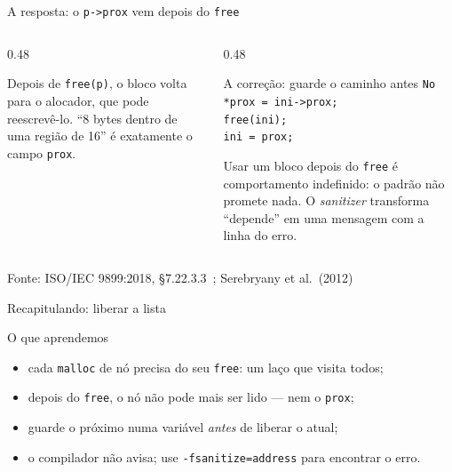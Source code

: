 \documentclass[aspectratio=169]{beamer}
\newcommand{\ptr}[1]{($(#1.one split north)!0.5!(#1.south east)$)}
\newcommand{\fonte}[1]{\vfill\hfill{\scriptsize\textcolor{UFSGray}{Fonte: #1}}}
\begin{document}
\begin{frame}{A resposta: o \texttt{p->prox} vem depois do \texttt{free}}
  \begin{columns}[c]
    \begin{column}{0.48\textwidth}
      \begin{center}
      \end{center}
      \small Depois de \texttt{free(p)}, o bloco volta para o alocador,
      que pode reescrevê-lo. ``8 bytes dentro de uma região de 16'' é
      exatamente o campo \texttt{prox}.
    \end{column}
    \begin{column}{0.48\textwidth}
      \begin{block}{A correção: guarde o caminho antes}
        \small
        \texttt{No *prox = ini->prox;}\\
        \texttt{free(ini);}\\
        \texttt{ini = prox;}
      \end{block}
      \small Usar um bloco depois do \texttt{free} é comportamento
      indefinido: o padrão não promete nada. O \emph{sanitizer} transforma
      ``depende'' em uma mensagem com a linha do erro.
    \end{column}
  \end{columns}
  \fonte{ISO/IEC 9899:2018, §7.22.3.3~\cite{iso2018c17};
    Serebryany et al.\ (2012)~\cite{serebryany2012asan}}
\end{frame}

\begin{frame}{Recapitulando: liberar a lista}
  \begin{block}{O que aprendemos}
    \begin{itemize}
      \item cada \texttt{malloc} de nó precisa do seu \texttt{free}: um laço
        que visita todos;
      \item depois do \texttt{free}, o nó não pode mais ser lido --- nem o
        \texttt{prox};
      \item guarde o próximo numa variável \emph{antes} de liberar o atual;
      \item o compilador não avisa; use \texttt{-fsanitize=address} para
        encontrar o erro.
    \end{itemize}
  \end{block}
\end{frame}
\end{document}
